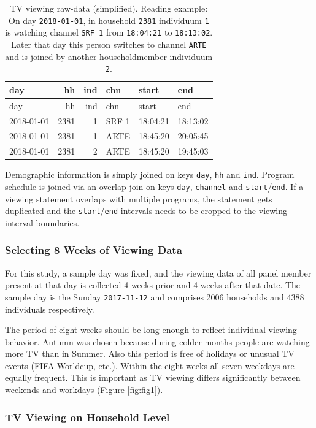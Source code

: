 \documentclass[]{article}
\begin{document}
\begin{longtable}[]{@{}lrrlll@{}}
\caption{\label{tab:tab1}TV viewing raw-data (simplified). Reading
example: On day \texttt{2018-01-01}, in household \texttt{2381}
individuum \texttt{1} is watching channel \texttt{SRF\ 1} from
\texttt{18:04:21} to \texttt{18:13:02}. Later that day this person
switches to channel \texttt{ARTE} and is joined by another
householdmember individuum \texttt{2}.}\tabularnewline
\toprule
day & hh & ind & chn & start & end\tabularnewline
\midrule
\endfirsthead
\toprule
day & hh & ind & chn & start & end\tabularnewline
\midrule
\endhead
2018-01-01 & 2381 & 1 & SRF 1 & 18:04:21 & 18:13:02\tabularnewline
2018-01-01 & 2381 & 1 & ARTE & 18:45:20 & 20:05:45\tabularnewline
2018-01-01 & 2381 & 2 & ARTE & 18:45:20 & 19:45:03\tabularnewline
\bottomrule
\end{longtable}

Demographic information is simply joined on keys \texttt{day},
\texttt{hh} and \texttt{ind}. Program schedule is joined via an overlap
join on keys \texttt{day}, \texttt{channel} and
\texttt{start}/\texttt{end}. If a viewing statement overlaps with
multiple programs, the statement gets duplicated and the
\texttt{start}/\texttt{end} intervals needs to be cropped to the viewing
interval boundaries.

\subsubsection{Selecting 8 Weeks of Viewing
Data}\label{selecting-8-weeks-of-viewing-data}

For this study, a sample day was fixed, and the viewing data of all
panel member present at that day is collected 4 weeks prior and 4 weeks
after that date. The sample day is the Sunday \texttt{2017-11-12} and
comprises 2006 households and 4388 individuals respectively.

The period of eight weeks should be long enough to reflect individual
viewing behavior. Autumn was chosen because during colder months people
are watching more TV than in Summer. Also this period is free of
holidays or unusual TV events (FIFA Worldcup, etc.). Within the eight
weeks all seven weekdays are equally frequent. This is important as TV
viewing differs significantly between weekends and workdays (Figure
\ref{fig:fig1}).

\subsubsection{TV Viewing on Household
Level}\label{tv-viewing-on-household-level}
\end{document}
